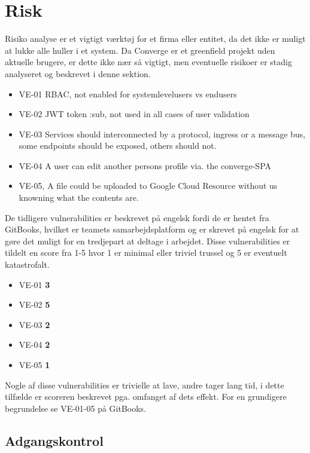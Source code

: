 \chapter{Risk}

Risiko analyse er et vigtigt værktøj for et firma eller entitet, da det ikke er muligt at lukke alle huller i et system. Da Converge er et greenfield projekt uden aktuelle brugere, er dette ikke nær så vigtigt, men eventuelle risikoer er stadig analyseret og beskrevet i denne sektion.

\begin{itemize}
    \item VE-01 RBAC, not enabled for systemlevelusers vs endusers
    \item VE-02 JWT token :sub, not used in all cases of user validation
    \item VE-03 Services should interconnected by a protocol, ingress or a message bus, some endpoints should be exposed, others should not.
    \item VE-04 A user can edit another persons profile via. the converge-SPA
    \item VE-05, A file could be uploaded to Google Cloud Resource without us knowning what the contents are.
\end{itemize}

De tidligere vulnerabilities er beskrevet på engelsk fordi de er hentet fra GitBooks, hvilket er teamets samarbejdsplatform og er skrevet på engelsk for at gøre det muligt for en tredjepart at deltage i arbejdet. Disse vulnerabilities er tildelt en score fra 1-5 hvor 1 er minimal eller triviel trussel og 5 er eventuelt katastrofalt.

\begin{itemize}
    \item VE-01 \textbf{3}
    \item VE-02 \textbf{5}
    \item VE-03 \textbf{2}
    \item VE-04 \textbf{2}
    \item VE-05 \textbf{1}
\end{itemize}

Nogle af disse vulnerabilities er trivielle at lave, andre tager lang tid, i dette tilfælde er scoreren beskrevet pga. omfanget af dets effekt. For en grundigere begrundelse se VE-01-05 på GitBooks.

\section{Adgangskontrol}

